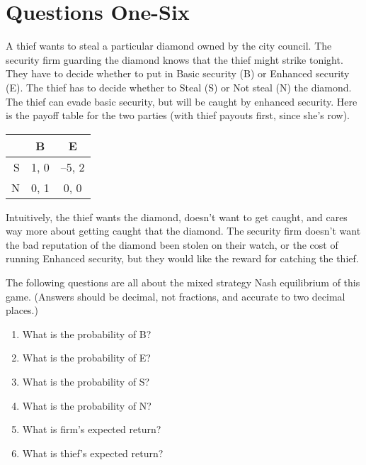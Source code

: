 
\def\mytitle{Mixed Strategies}
\def\myauthor{Assignment 5}
\def\mydate{Due February 10, 6pm}


\section{Questions One-Six}
\label{questionsone-six}

A thief wants to steal a particular diamond owned by the city council. The security firm guarding the diamond knows that the thief might strike tonight. They have to decide whether to put in Basic security (B) or Enhanced security (E). The thief has to decide whether to Steal (S) or Not steal (N) the diamond. The thief can evade basic security, but will be caught by enhanced security. Here is the payoff table for the two parties (with thief payouts first, since she's row).

\begin{table}[htbp]
\begin{minipage}{\linewidth}
\setlength{\tymax}{0.5\linewidth}
\centering
\small
\begin{tabulary}{\textwidth}{@{}rcc@{}} \toprule
 & B & E \\
\midrule

 S & 1, 0 & --5, 2\\
 N & 0, 1 & 0, 0 \\
\bottomrule

\end{tabulary}
\end{minipage}
\end{table}

Intuitively, the thief wants the diamond, doesn't want to get caught, and cares way more about getting caught that the diamond. The security firm doesn't want the bad reputation of the diamond been stolen on their watch, or the cost of running Enhanced security, but they would like the reward for catching the thief.

The following questions are all about the mixed strategy Nash equilibrium of this game. (Answers should be decimal, not fractions, and accurate to two decimal places.)

\begin{enumerate}
\item{} What is the probability of B?

\item{} What is the probability of E?

\item{} What is the probability of S?

\item{} What is the probability of N?

\item{} What is firm's expected return?

\item{} What is thief's expected return?

\end{enumerate}

